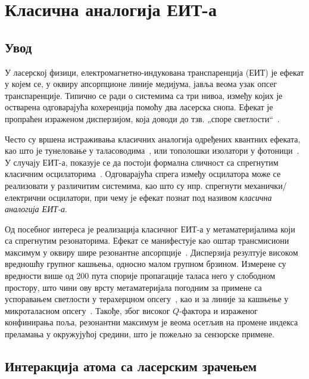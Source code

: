 \documentclass[main.tex]{subfiles}
\begin{document}
\chapter{Класична аналогија ЕИТ-а}%
\label{cha:klasik_eit}

\section{Увод}%
\label{sec:uvod}

У ласерској физици, електромагнетно-индукована транспаренција (ЕИТ) је ефекат у којем се, у оквиру апсорпционе линије медијума, јавља веома узак опсег транспаренције. Типично се ради о системима са три нивоа, између којих је остварена одговарајућа кохеренција помоћу два ласерска снопа. Ефекат је пропраћен израженом дисперзијом, која доводи до тзв. „споре светлости``~\cite{harris1990nonlinear}.

Често су вршена истраживања класичних аналогија одређених квантних ефеката, као што је тунеловање у таласоводима~\cite{PhysRevLett.97.157403,6511993}, или тополошки изолатори у фотоници~\cite{khanikaev2013photonic}. У случају ЕИТ-а, показује се да постоји формална сличност са спрегнутим класичним осцилаторима~\cite{garrido2002classical}. Одговарајућа спрега између осцилатора може се реализовати у различитим системима, као што су нпр. спрегнути механички/електрични осцилатори, при чему је ефекат познат под називом \emph{класична аналогија ЕИТ-а}.%

Од посебног интереса је реализација класичног ЕИТ-а у метаматеријалима који са спрегнутим резонаторима. Ефекат се манифестује као оштар трансмисиони максимум у оквиру шире резонантне апсорпције~\cite{tassin:09,cihan,mr05}. Дисперзија резултује високом вредношћу групног кашњења, односно малом групном брзином. Измерене су вредности више од 200 пута спорије пропагације таласа него у слободном простору, што чини ову врсту метаматеријала погодним за примене са успоравањем светлости у терахерцном опсегу~\cite{tassin:09}, као и за линије за кашњење у микроталасном опсегу~\cite{mr05}. Такође, због високог $Q$-фактора и израженог конфинирања поља, резонантни максимум је веома осетљив на промене индекса преламања у окружујућој средини, што је пожељно за сензорске примене.

\section{Интеракција атома са ласерским зрачењем}
\end{document}
